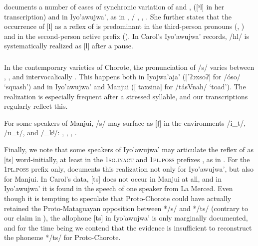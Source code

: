 \citet[22--23]{AG83} documents a number of cases of synchronic variation of  and ,  ([ˣl] in her transcription) and  in Iyo’awujwa’, as in ,  / , , . She further states that the occurrence of [l] as a reflex of  is predominant in the third-person pronouns (, ) and in the second-person active prefix (). In Carol’s Iyo’awujwa’ records, /hl/ is systematically realized as [l] after a pause.

\subsubsection{}\label{pch-s}

In the contemporary varieties of Chorote, the pronunciation of /s/ varies between , , and  intervocalically \citep[79]{JC18,JC14b}. This happens both in Iyojwa’aja’ ([ˈʔɔxsoʔ] \recind [ˈʔɔhsoʔ] for /óso/ `squash') and in Iyo’awujwa’ and Manjui ([ˈtaxsina] \recind [ˈtahsena] for /tásVnah/ `toad'). The realization  \recind {} is especially frequent after a stressed syllable, and our transcriptions regularly reflect this.

For some speakers of Manjui, /s/ may surface as [ʃ] in the environments /i\_t/, /u\_t/, and /\_kʲ/: , , , .

Finally, we note that some speakers of Iyo’awujwa’ may articulate the reflex of  as [ts] word-initially, at least in the 1\textsc{sg}.\textsc{inact} and 1\textsc{pl}.\textsc{poss} prefixes \citep[68–70, 76–77]{AG83}, as in . For the 1\textsc{pl}.\textsc{poss} prefix only, \citet{AG83} documents this realization not only for Iyo’awujwa’, but also for Manjui. In Carol’s data, [ts] does not occur in Manjui at all, and in Iyo’awujwa’ it is found in the speech of one speaker from La Merced. Even though it is tempting to speculate that Proto-Chorote could have actually retained the Proto-Mataguayan opposition between */s/ and */ts/ (contrary to our claim in ), the allophone [ts] in Iyo’awujwa’ is only marginally documented, and for the time being we contend that the evidence is insufficient to reconstruct the phoneme */ts/ for Proto-Chorote.

